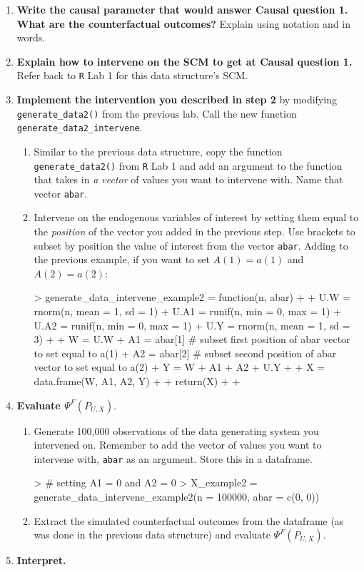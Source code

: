 \documentclass[answers]{exam}
\begin{document}
\begin{enumerate}
\item \textbf{Write the causal parameter that would answer Causal question 1. What are the counterfactual outcomes?} Explain using notation and in words.
\item \textbf{Explain how to intervene on the SCM to get at Causal question 1.} Refer back to \texttt{R} Lab 1 for this data structure's SCM.
\item \textbf{Implement the intervention you described in step 2} by modifying \texttt{generate\_data2()} from the previous lab. Call the new function \texttt{generate\_data2\_intervene}.
\begin{enumerate}
\item Similar to the previous data structure, copy the function \texttt{generate\_data2()} from \texttt{R} Lab 1 and add an argument to the function that takes in \textit{a vector} of values you want to intervene with. Name that vector \texttt{abar}.
\item Intervene on the endogenous variables of interest by setting them equal to the \textit{position} of the vector you added in the previous step. Use brackets to subset by position the value of interest from the vector \texttt{abar}. Adding to the previous example, if you want to set $A(1) = a(1)$ and $A(2) = a(2)$:
\begin{Schunk}
\begin{Sinput}
> generate_data_intervene_example2 = function(n, abar) {
+ 
+   U.W = rnorm(n, mean = 1, sd = 1)
+   U.A1 = runif(n, min = 0, max = 1)
+   U.A2 = runif(n, min = 0, max = 1)
+   U.Y = rnorm(n, mean = 1, sd = 3)
+ 
+   W = U.W
+   A1 = abar[1] # subset first position of abar vector to set equal to a(1)
+   A2 = abar[2] # subset second position of abar vector to set equal to a(2)
+   Y = W + A1 + A2 + U.Y
+ 
+   X = data.frame(W, A1, A2, Y)
+ 
+   return(X)
+ 
+ }
\end{Sinput}
\end{Schunk}
\end{enumerate}
\item \textbf{Evaluate $\Psi^F(P_{U,X})$}.
\begin{enumerate}
\item Generate 100,000 observations of the data generating system you intervened on. Remember to add the vector of values you want to intervene with, \texttt{abar} as an argument. Store this in a dataframe.
\begin{Schunk}
\begin{Sinput}
> # setting A1 = 0 and A2 = 0
> X_example2 = generate_data_intervene_example2(n = 100000, abar = c(0, 0))
\end{Sinput}
\end{Schunk}
\item Extract the simulated counterfactual outcomes from the dataframe (as was done in the previous data structure) and evaluate $\Psi^F(P_{U,X})$.
\end{enumerate}
\item \textbf{Interpret.}
\end{enumerate}
\end{document}

